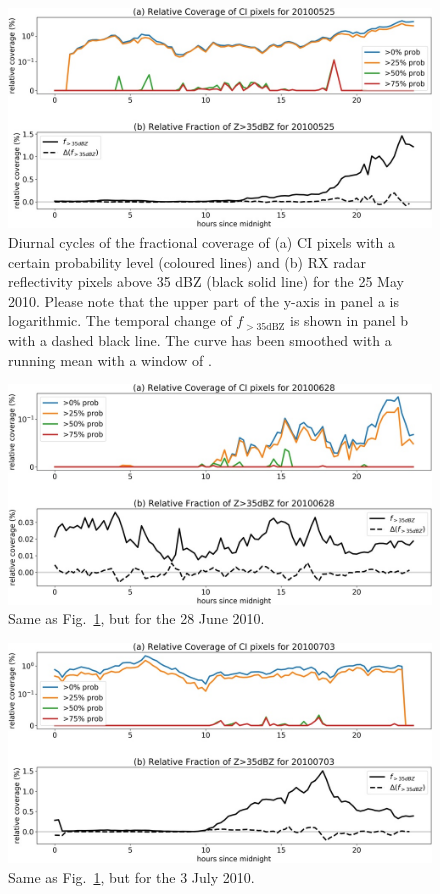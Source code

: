 \begin{figure}
\centering
\includegraphics[width=\textwidth]{Grafiken/Abbildungen/diurnal_cycle_20100525.jpg}
\caption{Diurnal cycles of the fractional coverage of (a) CI pixels with a certain probability level (coloured lines) and (b) RX radar reflectivity pixels above 35 dBZ (black solid line) for the 25 May 2010. Please note that the upper part of the y-axis in panel a is logarithmic. The temporal change of $f_{>35\mathrm{dBZ}}$ is shown in panel b with a dashed black line. The curve has been smoothed with a running mean with a window of .}
\label{fig:dc20100523}
\end{figure}
\begin{figure}
\centering
\includegraphics[width=\textwidth]{Grafiken/Abbildungen/diurnal_cycle_20100628.jpg}
\caption{Same as Fig.~\ref{fig:dc20100523}, but for the 28 June 2010.}
\label{fig:dc20100628}
\end{figure}
\begin{figure}
\centering
\includegraphics[width=\textwidth]{Grafiken/Abbildungen/diurnal_cycle_20100703.jpg}
\caption{Same as Fig.~\ref{fig:dc20100523}, but for the 3 July 2010.}
\label{fig:dc20100703}
\end{figure}
